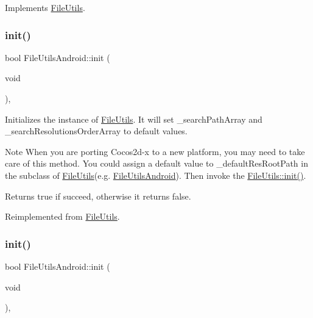 Implements \hyperlink{classFileUtils_aab14c8d4e292f7a1e9b2b2908d02a0ed}{File\+Utils}.

\mbox{\label{classFileUtilsAndroid_a5ff9d802609690baa039ebef0508b2c6}} 
\subsubsection{\texorpdfstring{init()}{init()}\hspace{0.1cm}{\footnotesize\ttfamily [1/2]}}
{\footnotesize\ttfamily bool File\+Utils\+Android\+::init (\begin{DoxyParamCaption}\item[{void}]{ }\end{DoxyParamCaption})\hspace{0.3cm}{\ttfamily [override]}, {\ttfamily [virtual]}}

Initializes the instance of \hyperlink{classFileUtils}{File\+Utils}. It will set \+\_\+search\+Path\+Array and \+\_\+search\+Resolutions\+Order\+Array to default values.

\begin{DoxyNote}{Note}
When you are porting Cocos2d-\/x to a new platform, you may need to take care of this method. You could assign a default value to \+\_\+default\+Res\+Root\+Path in the subclass of \hyperlink{classFileUtils}{File\+Utils}(e.\+g. \hyperlink{classFileUtilsAndroid}{File\+Utils\+Android}). Then invoke the \hyperlink{classFileUtils_a2c891e99dc7af7343f4f9e8d4798a563}{File\+Utils\+::init()}. 
\end{DoxyNote}
\begin{DoxyReturn}{Returns}
true if succeed, otherwise it returns false. 
\end{DoxyReturn}


Reimplemented from \hyperlink{classFileUtils_a2c891e99dc7af7343f4f9e8d4798a563}{File\+Utils}.

\mbox{\label{classFileUtilsAndroid_a5ff9d802609690baa039ebef0508b2c6}} 
\subsubsection{\texorpdfstring{init()}{init()}\hspace{0.1cm}{\footnotesize\ttfamily [2/2]}}
{\footnotesize\ttfamily bool File\+Utils\+Android\+::init (\begin{DoxyParamCaption}\item[{void}]{ }\end{DoxyParamCaption})\hspace{0.3cm}{\ttfamily [override]}, {\ttfamily [virtual]}}

